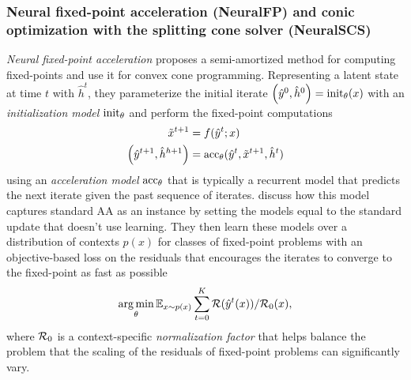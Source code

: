 \documentclass[twoside,11pt]{article}
\begin{document}
\subsubsection{Neural fixed-point acceleration (NeuralFP) and conic optimization with the splitting cone solver (NeuralSCS)}
\label{sec:apps:neural-fp}
\emph{Neural fixed-point acceleration} \citep{venkataraman2021neural}
proposes a semi-amortized method for computing fixed-points
and use it for convex cone programming.
Representing a latent state at time $t$ with $\hat h^t$,
they parameterize the initial iterate
$\left(\hat y^0, \hat h^0\right) = {\rm init}_\theta(x)$
with an \emph{initialization model} ${\rm init_\theta}$
and perform the fixed-point computations
\begin{equation}
  \begin{aligned}
    \tilde x^{t+1} &= f(\hat y^t; x) \\
    \left(\hat y^{t+1},\hat h^{h+1}\right) &= {\rm acc}_\theta(\hat y^t, \tilde x^{t+1}, \hat h^t)
  \end{aligned}
  \label{eq:neural-fp}
\end{equation}
using an \emph{acceleration model} ${\rm acc_\theta}$
that is typically a recurrent model that predicts the
next iterate given the past sequence of iterates.
\citet[Prop. 1]{venkataraman2021neural} discuss how
this model captures standard AA as an instance
by setting the models equal to the standard update
that doesn't use learning.
They then learn these models over a distribution of contexts $p(x)$
for classes of fixed-point problems with an objective-based loss
on the residuals that encourages the iterates to converge
to the fixed-point as fast as possible
\begin{equation}
  \operatorname*{arg\,min}_\theta \operatorname{\mathbb{E}}_{x\sim p(x)} \sum_{t=0}^K {\mathcal{R}}(\hat y^t(x))
  / {\mathcal{R}}_0(x),
  \label{eq:neural-fp-loss}
\end{equation}
where ${\mathcal{R}}_0$ is a context-specific \emph{normalization factor}
that helps balance the problem that the scaling of the
residuals of fixed-point problems can significantly vary.
\end{document}
